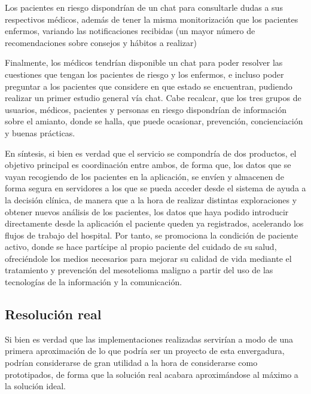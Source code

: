 \documentclass{article}
\begin{document}
Los pacientes en riesgo dispondrían de un chat para consultarle  dudas
a sus respectivos médicos, además de tener la misma monitorización que
los pacientes enfermos,  variando  las	notificaciones	recibidas  (un
mayor número de recomendaciones sobre consejos y hábitos  a  realizar)

Finalmente,  los  médicos  tendrían  disponible  un  chat  para  poder
resolver las cuestiones que tengan  los  pacientes  de	riesgo	y  los
enfermos, e incluso poder preguntar a los pacientes que  considere  en
que estado se encuentran, pudiendo realizar un primer estudio  general
vía chat.  Cabe recalcar, que los tres grupos  de  usuarios,  médicos,
pacientes y personas en riesgo dispondrían  de	información  sobre  el
amianto,  donde   se   halla,	que   puede   ocasionar,   prevención,
concienciación y buenas prácticas.

En síntesis, si bien es verdad que el servicio se  compondría  de  dos
productos, el objetivo principal es coordinación entre ambos, de forma
que, los datos	que  se  vayan	recogiendo  de	los  pacientes	en  la
aplicación, se envíen y almacenen de forma segura en servidores a  los
que se pueda acceder desde el sistema de ayuda a la decisión  clínica,
de manera que a la hora de realizar distintas exploraciones y  obtener
nuevos análisis de los pacientes, los datos que haya podido introducir
directamente desde la aplicación el paciente  queden  ya  registrados,
acelerando  los  flujos  de  trabajo  del  hospital.   Por  tanto,  se
promociona la condición de paciente activo, donde se hace partícipe al
propio paciente del cuidado  de  su  salud,  ofreciéndole  los	medios
necesarios para mejorar su calidad de vida mediante el	tratamiento  y
prevención del mesotelioma maligno a partir del uso de las tecnologías
de la información y la comunicación.

\subsection{Resolución real}

Si bien es verdad que las implementaciones realizadas servirían a modo
de una primera aproximación de lo que podría ser un proyecto  de  esta
envergadura, podrían considerarse  de  gran  utilidad  a  la  hora  de
considerarse como prototipados, de forma que la solución real  acabara
aproximándose al máximo a la solución ideal.
\end{document}

